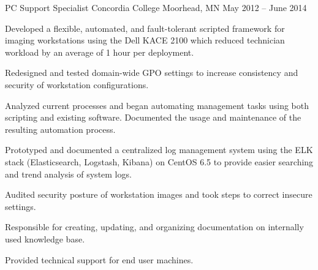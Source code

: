 \cventry
{PC Support Specialist} %
{Concordia College} %
{Moorhead, MN} %
{May 2012 – June 2014} %
{
  	\begin{cvitems} %
        \item {Developed a flexible, automated, and fault-tolerant scripted framework for imaging workstations using the Dell KACE 2100 which reduced technician workload by an average of 1 hour per deployment.}
		\item {Redesigned and tested domain-wide GPO settings to increase consistency and security of workstation configurations.}
		\item {Analyzed current processes and began automating management tasks using both scripting and existing software. Documented the usage and maintenance of the resulting automation process.}
		\item {Prototyped and documented a centralized log management system using the ELK stack (Elasticsearch, Logstash, Kibana) on CentOS 6.5 to provide easier searching and trend analysis of system logs.}
		\item {Audited security posture of workstation images and took steps to correct insecure settings.}
		\item {Responsible for creating, updating, and organizing documentation on internally used knowledge base.}
		\item {Provided technical support for end user machines.}
	\end{cvitems}
}